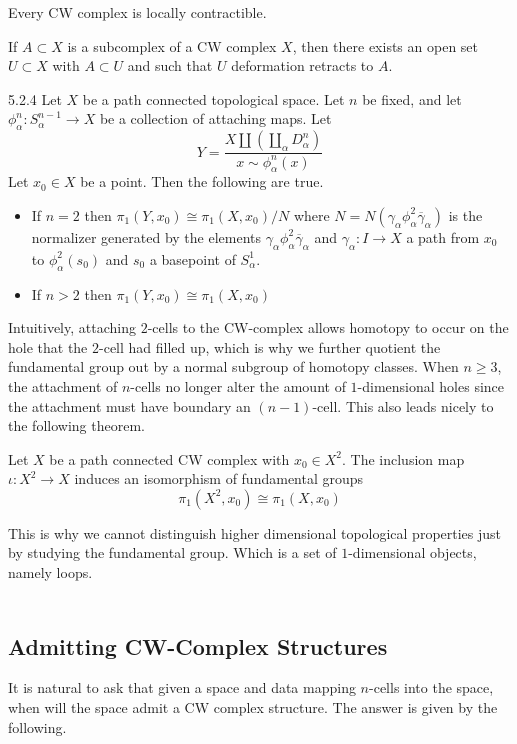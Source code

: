 \documentclass[a4paper]{article}
\begin{document}
\begin{prp}{}{} Every CW complex is locally contractible. 
\end{prp}

\begin{prp}{}{} If $A\subset X$ is a subcomplex of a CW complex $X$, then there exists an open set $U\subset X$ with $A\subset U$ and such that $U$ deformation retracts to $A$. 
\end{prp}

\begin{prp}{}{5.2.4} Let $X$ be a path connected topological space. Let $n$ be fixed, and let $\phi_\alpha^n:S_\alpha^{n-1}\to X$ be a collection of attaching maps. Let $$Y=\frac{X\amalg\left(\coprod_{\alpha}D_\alpha^n\right)}{x\sim\phi_\alpha^n(x)}$$ Let $x_0\in X$ be a point. Then the following are true. 
\begin{itemize}
\item If $n=2$ then $\pi_1(Y,x_0)\cong\pi_1(X,x_0)/N$ where $N=N(\gamma_\alpha\phi_\alpha^2\overline{\gamma}_\alpha)$ is the normalizer generated by the elements $\gamma_\alpha\phi_\alpha^2\overline{\gamma}_\alpha$ and $\gamma_\alpha:I\to X$ a path from $x_0$ to $\phi_\alpha^2(s_0)$ and $s_0$ a basepoint of $S_\alpha^1$. 
\item If $n>2$ then $\pi_1(Y,x_0)\cong\pi_1(X,x_0)$
\end{itemize}
\end{prp}

Intuitively, attaching $2$-cells to the CW-complex allows homotopy to occur on the hole that the $2$-cell had filled up, which is why we further quotient the fundamental group out by a normal subgroup of homotopy classes. When $n\geq 3$, the attachment of $n$-cells no longer alter the amount of $1$-dimensional holes since the attachment must have boundary an $(n-1)$-cell. This also leads nicely to the following theorem. 

\begin{thm}{}{} Let $X$ be a path connected CW complex with $x_0\in X^2$. The inclusion map $\iota:X^2\to X$ induces an isomorphism of fundamental groups $$\pi_1(X^2,x_0)\cong\pi_1(X,x_0)$$
\end{thm}

This is why we cannot distinguish higher dimensional topological properties just by studying the fundamental group. Which is a set of $1$-dimensional objects, namely loops. \\~\\

\subsection{Admitting CW-Complex Structures}
It is natural to ask that given a space and data mapping $n$-cells into the space, when will the space admit a CW complex structure. The answer is given by the following. 
\end{document}
